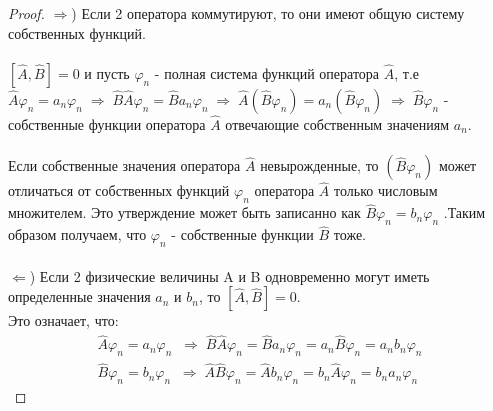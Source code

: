 \documentclass[__main__.tex]{subfiles}
\begin{document}
\begin{proof}
$\Rightarrow$) Если 2 оператора коммутируют, то они имеют общую систему собственных функций.\\\\
$[\hat{A},\hat{B}]=0$ и пусть ${\varphi_n}$ - полная система функций оператора $\hat{A}$, т.е $\hat{A}\varphi_n = a_n\varphi_n \; \Rightarrow \; \hat{B}\hat{A}\varphi_n = \hat{B}a_n\varphi_n \; \Rightarrow \; \hat{A}(\hat{B}\varphi_n) = a_n(\hat{B}\varphi_n) \; \Rightarrow \; \hat{B}\varphi_n$ - собственные функции оператора $\hat{A}$ отвечающие собственным значениям $a_n$.  \\\\

Если собственные значения оператора $\hat{A}$ невырожденные, то $(\hat{B}\varphi_n)$ может отличаться от собственных функций $\varphi_n$ оператора $\hat{A}$ только числовым множителем. Это утверждение может быть записанно как $\hat{B}\varphi_n = b_n\varphi_n$ .Таким образом получаем, что $\varphi_n$ - собственные функции $\hat{B}$ тоже.\\\\
$\Leftarrow$) Если 2 физические величины A и B одновременно могут иметь определенные значения $a_n$ и $b_n$, то $[\hat{A},\hat{B}] = 0$.\\

Это означает, что:
\begin{gather*}
\hat{A}\varphi_n = a_n\varphi_n \;\; \Rightarrow \; \hat{B}\hat{A}\varphi_n=\hat{B}a_n\varphi_n=a_n\hat{B}\varphi_n=a_nb_n\varphi_n\\
\hat{B}\varphi_n = b_n\varphi_n \;\; \Rightarrow \;
\hat{A}\hat{B}\varphi_n=\hat{A}b_n\varphi_n = b_n\hat{A}\varphi_n = b_na_n\varphi_n
\end{gather*}
\end{proof}
\end{document}
